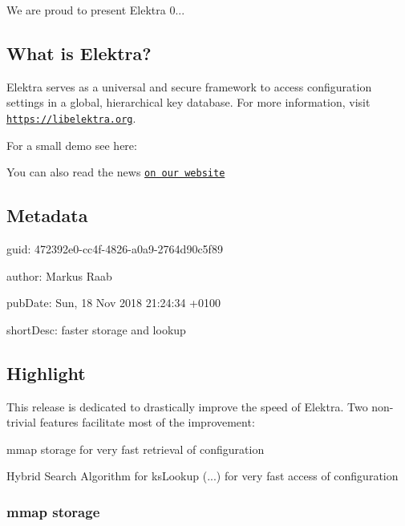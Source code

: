 We are proud to present Elektra 0...

\subsection*{What is Elektra?}

Elektra serves as a universal and secure framework to access configuration settings in a global, hierarchical key database. For more information, visit \href{https://libelektra.org}{\tt https\+://libelektra.\+org}.

For a small demo see here\+:

\href{https://asciinema.org/a/cantr04assr4jkv8v34uz9b8r}{\tt }

You can also read the news \href{https://www.libelektra.org/news/0.8.25-release}{\tt on our website}

\subsection*{Metadata}


\begin{DoxyItemize}
\item guid\+: 472392e0-\/cc4f-\/4826-\/a0a9-\/2764d90c5f89
\item author\+: Markus Raab
\item pub\+Date\+: Sun, 18 Nov 2018 21\+:24\+:34 +0100
\item short\+Desc\+: faster storage and lookup
\end{DoxyItemize}

\subsection*{Highlight}

This release is dedicated to drastically improve the speed of Elektra. Two non-\/trivial features facilitate most of the improvement\+:


\begin{DoxyItemize}
\item mmap storage for very fast retrieval of configuration
\item Hybrid Search Algorithm for {\ttfamily ks\+Lookup (...)} for very fast access of configuration
\end{DoxyItemize}

\subsubsection*{mmap storage}

